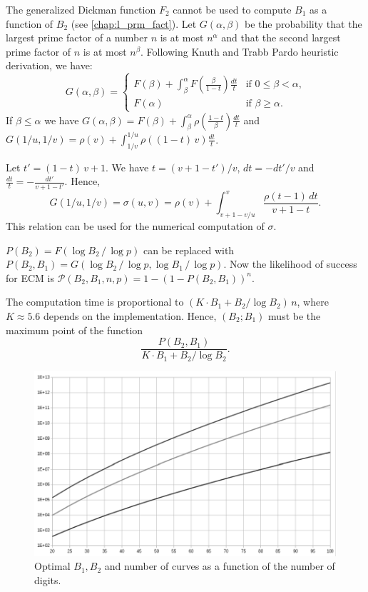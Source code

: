 \documentclass[a4paper, 11pt, pdftex]{report}
\theoremstyle{plain}
\theoremstyle{definition}
\begin{document}
The generalized Dickman function $F_2$ cannot be used to compute $B_1$ as a function of $B_2$ (see \autoref{chap:l_prm_fact}). Let $G(\alpha, \beta)$ be the probability that the largest prime factor
of a number $n$ is at most $n^\alpha$ and that the second largest prime factor of $n$ is at most
$n^\beta$. Following Knuth and Trabb Pardo \cite{KnuthPardo1} heuristic derivation, we have:
\begin{equation*}
G(\alpha, \beta) = \begin{cases}
F(\beta) + \int_\beta^\alpha F \left(\frac{\beta}{1-t} \right) \frac{dt}{t} & \text{if } 0 \leq \beta < \alpha \text{,}\\
F(\alpha) & \text{if } \beta \geq \alpha \text{.}
\end{cases}
\end{equation*}
If $\beta \leq \alpha$ we have
$G(\alpha, \beta) = F(\beta) + \int_\beta^\alpha \rho \left(\frac{1-t}{\beta} \right) \frac{dt}{t}$
and $G(1/u, 1/v) = \rho(v) + \int_{1/v}^{1/u} \rho \left((1-t)\, v \right) \frac{dt}{t}$.

Let $t' = (1-t)\, v + 1$. We have $t = (v + 1 - t')/v$, $dt = -dt'/v$ and
$\frac{dt}{t} = -\frac{dt'}{v + 1 - t'}$. Hence,
$$G(1/u, 1/v) = \sigma(u, v) = \rho(v) + \int_{v + 1 - v/u}^v \frac{\rho(t - 1)\, dt}{v + 1 - t}.$$
This relation can be used for the numerical computation of $\sigma$.

$P(B_2) = F(\log B_2\, /\, \log p)$ can be replaced with $P(B_2, B_1) = G(\log B_2\, /\, \log p,
\log B_1\, /\, \log p)$. Now the likelihood of success for ECM is
$\mathcal{P}(B_2, B_1, n, p) = 1 - \left(1 - P(B_2, B_1) \right)^n$.

The computation time is proportional to $\left(K\cdot B_1 + B_2 / \log B_2 \right)\, n$, where
$K \approx 5.6$ depends on the implementation. Hence, $(B_2; B_1)$ must be the maximum point of the
function
$$\frac{P(B_2, B_1)}{K\cdot B_1 + B_2 / \log B_2}.$$
\begin{figure}[!ht]
	\vspace*{-0.5cm}
	\centering
	\includegraphics[width=14.5cm, angle=0]{img/B1_B2_n_digits.pdf}
	\caption{\label{fig:B2_dgt} Optimal $B_1, B_2$ and number of curves as a function of the number of digits.}
\end{figure}
\end{document}
